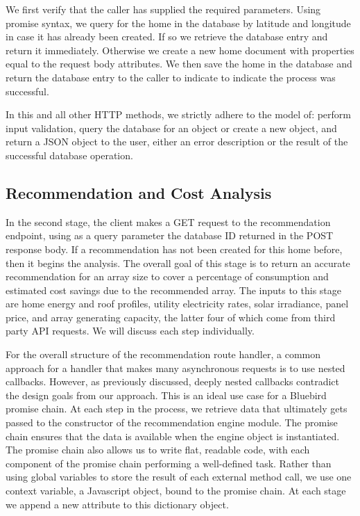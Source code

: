 \documentclass[pageno]{jpaper}
\begin{document}
We first verify that the caller has supplied the required parameters. Using promise syntax, we query for the home in the database by latitude and longitude in case it has already been created. If so we retrieve the database entry and return it immediately. Otherwise we create a new home document with properties equal to the request body attributes. We then save the home in the database and return the database entry to the caller to indicate to indicate the process was successful.

In this and all other HTTP methods, we strictly adhere to the model of: perform input validation, query the database for an object or create a new object, and return a JSON object to the user, either an error description or the result of the successful database operation.

\subsection{Recommendation and Cost Analysis}
In the second stage, the client makes a GET request to the recommendation endpoint, using as a query parameter the database ID returned in the POST response body. If a recommendation has not been created for this home before, then it begins the analysis. The overall goal of this stage is to return an accurate recommendation for an array size to cover a percentage of consumption and estimated cost savings due to the recommended array. The inputs to this stage are home energy and roof profiles, utility electricity rates, solar irradiance, panel price, and array generating capacity, the latter four of which come from third party API requests. We will discuss each step individually. 

For the overall structure of the recommendation route handler, a common approach for a handler that makes many asynchronous requests is to use nested callbacks. However, as previously discussed, deeply nested callbacks contradict the design goals from our approach. This is an ideal use case for a Bluebird promise chain. At each step in the process, we retrieve data that ultimately gets passed to the constructor of the recommendation engine module. The promise chain ensures that the data is available when the engine object is instantiated. The promise chain also allows us to write flat, readable code, with each component of the promise chain performing a well-defined task. Rather than using global variables to store the result of each external method call, we use one context variable, a Javascript object, bound to the promise chain. At each stage we append a new attribute to this dictionary object.
\end{document}

